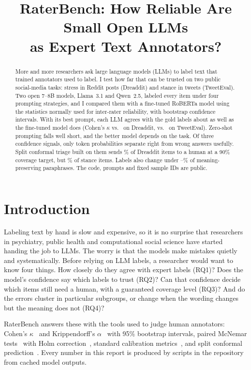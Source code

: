 \documentclass[10pt,twocolumn]{article}
\title{\textbf{RaterBench: How Reliable Are Small Open LLMs\\as Expert Text Annotators?}}
\author{\authorname}
\date{}
\begin{document}
\maketitle

\begin{abstract}
More and more researchers ask large language models (LLMs) to label text that trained annotators
used to label. I test how far that can be trusted on two public social-media tasks: stress in
Reddit posts (Dreaddit) and stance in tweets (TweetEval). Two open 7--8B models, Llama~3.1 and
Qwen~2.5, labeled every item under four prompting strategies, and I compared them with a
fine-tuned RoBERTa model using the statistics normally used for inter-rater reliability, with
bootstrap confidence intervals. With its best prompt, each LLM agrees with the gold labels about
as well as the fine-tuned model does (Cohen's $\kappa$ \kappaBestDr{} vs.\ \kappaFtDr{} on
Dreaddit, \kappaBestTe{} vs.\ \kappaFtTe{} on TweetEval). Zero-shot prompting falls well short,
and the better model depends on the task. Of three confidence signals, only token probabilities
separate right from wrong answers usefully. Split conformal triage built on them sends
\cpRoutedDr\% of Dreaddit items to a human at a 90\% coverage target, but \cpRoutedTe\% of
stance items. Labels also change under \flipParaMin--\flipParaMax\% of meaning-preserving
paraphrases. The code, prompts and fixed sample IDs are public.
\end{abstract}

\section{Introduction}
Labeling text by hand is slow and expensive, so it is no surprise that researchers in
psychiatry, public health and computational social science have started handing the job to
LLMs. The worry is that the models make mistakes quietly and systematically. Before relying on
LLM labels, a researcher would want to know four things. How closely do they agree with expert
labels (RQ1)? Does the model's confidence say which labels to trust (RQ2)? Can that confidence
decide which items still need a human, with a guaranteed coverage level (RQ3)? And do the errors
cluster in particular subgroups, or change when the wording changes but the meaning does not
(RQ4)?

RaterBench answers these with the tools used to judge human annotators: Cohen's
$\kappa$~\cite{cohen1960kappa} and Krippendorff's $\alpha$~\cite{krippendorff2004content} with
95\% bootstrap intervals, paired McNemar tests~\cite{mcnemar1947} with Holm
correction~\cite{holm1979}, standard calibration metrics~\cite{guo2017calibration}, and split
conformal prediction~\cite{angelopoulos2021gentle}. Every number in this report is produced by
scripts in the repository from cached model outputs.
\end{document}
